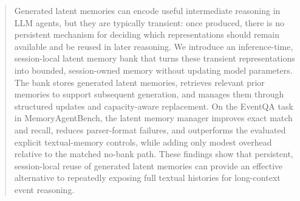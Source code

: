 \begin{abstract}
\label{sec:abstract}
Generated latent memories can encode useful intermediate reasoning in LLM agents, but they are typically transient: once produced, there is no persistent mechanism for deciding which representations should remain available and be reused in later reasoning. We introduce an inference-time, session-local latent memory bank that turns these transient representations into bounded, session-owned memory without updating model parameters. The bank stores generated latent memories, retrieves relevant prior memories to support subsequent generation, and manages them through structured updates and capacity-aware replacement. On the EventQA task in MemoryAgentBench, the latent memory manager improves exact match and recall, reduces parser-format failures, and outperforms the evaluated explicit textual-memory controls, while adding only modest overhead relative to the matched no-bank path. These findings show that persistent, session-local reuse of generated latent memories can provide an effective alternative to repeatedly exposing full textual histories for long-context event reasoning.
\end{abstract}